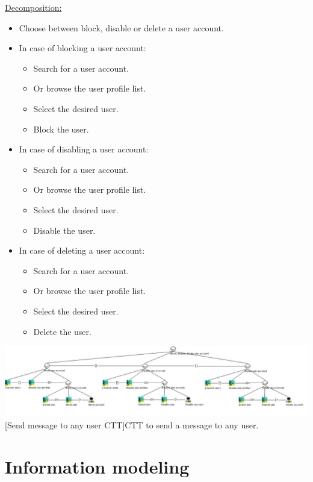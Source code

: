 \documentclass[11pt, a4paper,svglistings,oneside]{book}
\begin{document}
\underline{Decomposition:}
\begin{itemize}
\item Choose between block, disable or delete  a user account.
\item In case of blocking a user account:
\begin{itemize}
\item Search for a user account.
\item Or browse the user profile list.
\item Select the desired user.
\item Block the user.
\end{itemize}
\item In case of disabling a user account:
\begin{itemize}
\item Search for a user account.
\item Or browse the user profile list.
\item Select the desired user.
\item Disable the user.
\end{itemize}
\item In case of deleting a user account:
\begin{itemize}
\item Search for a user account.
\item Or browse the user profile list.
\item Select the desired user.
\item Delete the user.
\end{itemize}
\end{itemize}
\noindent\begin{minipage}{\textwidth}
    \centering
   \includegraphics[angle=270,scale=0.5]{CTT_Admin_Block_Disable_Delete.png}
 [Send message to any user CTT]{CTT to send a message to any user.}
\end{minipage}


\section{Information modeling}
\end{document}
